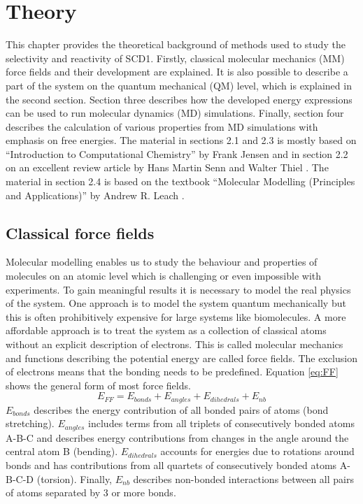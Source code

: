 \chapter{Theory}
This chapter provides the theoretical background of methods used to study the selectivity and reactivity of SCD1. Firstly, classical molecular mechanics (MM) force fields and their development are explained. It is also possible to describe a part of the system on the quantum mechanical (QM) level, which is explained in the second section. Section three describes how the developed energy expressions can be used to run molecular dynamics (MD) simulations. Finally, section four describes the calculation of various properties from MD simulations with emphasis on free energies. The material in sections 2.1 and 2.3 is mostly based on ``Introduction to Computational Chemistry'' by Frank Jensen \cite{Jensen2007} and in section 2.2 on an excellent review article by Hans Martin Senn and Walter Thiel \cite{Senn2009}. The material in section 2.4 is based on the textbook ``Molecular Modelling (Principles and Applications)'' by Andrew R. Leach \cite{Leach}.

\section{Classical force fields}
Molecular modelling enables us to study the behaviour and properties of molecules on an atomic level which is challenging or even impossible with experiments. To gain meaningful results it is necessary to model the real physics of the system. One approach is to model the system quantum mechanically but this is often prohibitively expensive for large systems like biomolecules. A more affordable approach is to treat the system as a collection of classical atoms without an explicit description of electrons. This is called molecular mechanics and functions describing the potential energy are called force fields. The exclusion of electrons means that the bonding needs to be predefined. Equation \ref{eq:FF} shows the general form of most force fields.
\begin{equation} \label{eq:FF}
    E_{FF} = E_{bonds} + E_{angles} + E_{dihedrals} + E_{nb}
\end{equation}
$E_{bonds}$ describes the energy contribution of all bonded pairs of atoms (bond stretching). $E_{angles}$ includes terms from all triplets of consecutively bonded atoms A-B-C and describes energy contributions from changes in the angle around the central atom B (bending). $E_{dihedrals}$ accounts for energies due to rotations around bonds and has contributions from all quartets of consecutively bonded atoms A-B-C-D (torsion). Finally, $E_{nb}$ describes non-bonded interactions between all pairs of atoms separated by 3 or more bonds.

